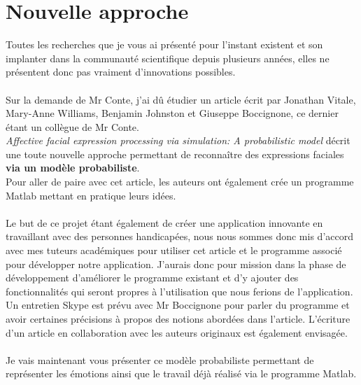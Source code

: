 \documentclass[poster]{polytech/polytech}
\begin{document}
\chapter{Nouvelle approche}
\label{chap:chap_newmodel}
Toutes les recherches que je vous ai présenté pour l'instant existent et son implanter dans la communauté scientifique depuis plusieurs années, elles ne présentent donc pas vraiment d'innovations possibles.\\
\\
Sur la demande de Mr Conte, j'ai dû étudier un article écrit par Jonathan Vitale, Mary-Anne Williams, Benjamin Johnston et Giuseppe Boccignone, ce dernier étant un collègue de Mr Conte.\\
\textit{Affective facial expression processing via simulation: A probabilistic model} \cite{italiens} décrit une toute nouvelle approche permettant de reconnaître des expressions faciales \textbf{via un modèle probabiliste}.\\
Pour aller de paire avec cet article, les auteurs ont également crée un programme Matlab mettant en pratique leurs idées.\\
\\
Le but de ce projet étant également de créer une application innovante en travaillant avec des personnes handicapées, nous nous sommes donc mis d'accord avec mes tuteurs académiques pour utiliser cet article et le programme associé pour développer notre application. J'aurais donc pour mission dans la phase de développement d'améliorer le programme existant et d'y ajouter des fonctionnalités qui seront propres à l'utilisation que nous ferions de l'application.\\
Un entretien Skype est prévu avec Mr Boccignone pour parler du programme et avoir certaines précisions à propos des notions abordées dans l'article. L'écriture d'un article en collaboration avec les auteurs originaux est également envisagée.\\
\\
Je vais maintenant vous présenter ce modèle probabiliste permettant de représenter les émotions ainsi que le travail déjà réalisé via le programme Matlab.

\newpage
\end{document}
